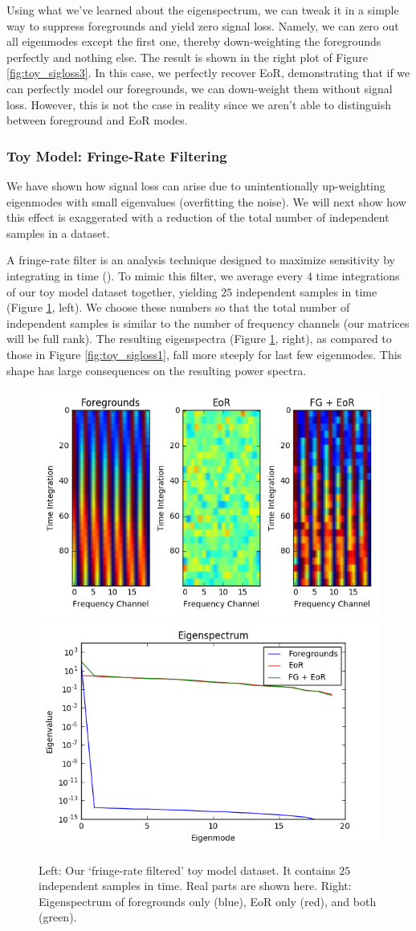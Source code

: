 \documentclass[preprint2,numberedappendix,tighten,twocolappendix]{aastex6}  %
\begin{document}
Using what we've learned about the eigenspectrum, we can tweak it in a simple way to suppress foregrounds and yield zero signal loss. Namely, we can zero out all eigenmodes except the first one, thereby down-weighting the foregrounds perfectly and nothing else. The result is shown in the right plot of Figure \ref{fig:toy_sigloss3}. In this case, we perfectly recover EoR, demonstrating that if we can perfectly model our foregrounds, we can down-weight them without signal loss. However, this is not the case in reality since we aren't able to distinguish between foreground and EoR modes.

\subsubsection{Toy Model: Fringe-Rate Filtering}

We have shown how signal loss can arise due to unintentionally up-weighting eigenmodes with small eigenvalues (overfitting the noise). We will next show how this effect is exaggerated with a reduction of the total number of independent samples in a dataset. 

A fringe-rate filter is an analysis technique designed to maximize sensitivity by integrating in time (\citealt{parsons_et_al2016}). To mimic this filter, we average every $4$ time integrations of our toy model dataset together, yielding $25$ independent samples in time (Figure \ref{fig:toy_sigloss5}, left). We choose these numbers so that the total number of independent samples is similar to the number of frequency channels (our matrices will be full rank). The resulting eigenspectra (Figure \ref{fig:toy_sigloss5}, right), as compared to those in Figure \ref{fig:toy_sigloss1}, fall more steeply for last few eigenmodes. This shape has large consequences on the resulting power spectra.

\begin{figure}
	\centering
	\includegraphics[trim={0.3cm 0.2cm 0.3cm 0.3cm},clip,height=0.3\textwidth]{plots/toy_sigloss5.png}
	\includegraphics[trim={0.3cm 0.2cm 0.3cm 0.3cm},clip,height=0.3\textwidth]{plots/toy_sigloss6.png}
	\caption{Left: Our `fringe-rate filtered' toy model dataset. It contains $25$ independent samples in time. Real parts are shown here. Right: Eigenspectrum of foregrounds only (blue), EoR only (red), and both (green).}
	\label{fig:toy_sigloss5}
\end{figure}
\end{document}
